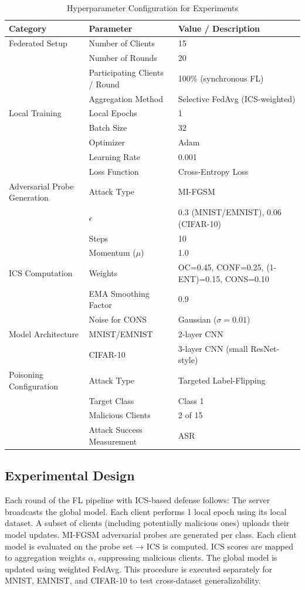 \documentclass[conference]{IEEEtran}
\begin{document}
\begin{table}[!h]
\centering
\caption{Hyperparameter Configuration for Experiments}
\label{tab:hyperparameters}
\footnotesize
\begin{tabular}{|p{2.3cm}|p{2.5cm}|p{2.3cm}|}
\hline
\textbf{Category} & \textbf{Parameter} & \textbf{Value / Description} \\
\hline
Federated Setup & Number of Clients & 15 \\
  & Number of Rounds & 20 \\
  & Participating Clients / Round & 100\% (synchronous FL) \\
  & Aggregation Method & Selective FedAvg (ICS-weighted) \\
\hline
Local Training & Local Epochs & 1 \\
  & Batch Size & 32 \\
  & Optimizer & Adam \\
  & Learning Rate & 0.001 \\
  & Loss Function & Cross-Entropy Loss \\
\hline
Adversarial Probe Generation & Attack Type & MI-FGSM \\
  & $\epsilon$ & 0.3 (MNIST/EMNIST), 0.06 (CIFAR-10) \\
  & Steps & 10 \\
  & Momentum ($\mu$) & 1.0 \\
\hline
ICS Computation & Weights & OC=0.45, CONF=0.25, (1-ENT)=0.15, CONS=0.10 \\
  & EMA Smoothing Factor & 0.9 \\
  & Noise for CONS & Gaussian ($\sigma = 0.01$) \\
\hline
Model Architecture & MNIST/EMNIST & 2-layer CNN \\
  & CIFAR-10 & 3-layer CNN (small ResNet-style) \\
\hline
Poisoning Configuration & Attack Type & Targeted Label-Flipping \\
  & Target Class & Class 1 \\
  & Malicious Clients & 2 of 15 \\
  & Attack Success Measurement & ASR \\
\hline
\end{tabular}
\end{table}

\subsection{Experimental Design}
Each round of the FL pipeline with ICS-based defense follows: The server broadcasts the global model. Each client performs 1 local epoch using its local dataset. A subset of clients (including potentially malicious ones) uploads their model updates. MI-FGSM adversarial probes are generated per class. Each client model is evaluated on the probe set → ICS is computed. ICS scores are mapped to aggregation weights $\alpha$, suppressing malicious clients. The global model is updated using weighted FedAvg. This procedure is executed separately for MNIST, EMNIST, and CIFAR-10 to test cross-dataset generalizability.
\end{document}
